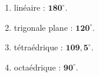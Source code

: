 \documentclass[11pt,a4paper]{article}
\begin{document}
\begin{corrige}
\begin{enumerate}[label=\alph*)]
  \item linéaire : $\mathbf{180^\circ}$.
  \item trigonale plane : $\mathbf{120^\circ}$.
  \item tétraédrique : $\mathbf{109{,}5^\circ}$.
  \item octaédrique : $\mathbf{90^\circ}$.
\end{enumerate}
\end{corrige}
\end{document}
